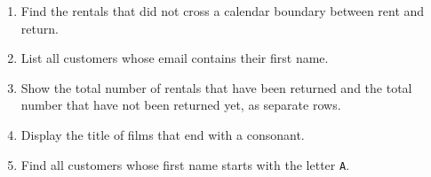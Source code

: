 \documentclass[12pt,a4paper]{article}
\newif\ifshowsolutions
\begin{document}
\begin{enumerate}

    \item Find the rentals that did not cross a calendar boundary between rent and return.

    \ifshowsolutions
    \begin{lstlisting}[language=SQL]
    SELECT rental_id, rental_date, return_date
    FROM rental
    WHERE EXTRACT(MONTH FROM rental_date) =
          EXTRACT(MONTH FROM return_date);
    \end{lstlisting}
    \fi

\item List all customers whose email contains their first name.

\ifshowsolutions
\textbf{Solution:}
\begin{lstlisting}[language=SQL]
SELECT first_name, last_name, email
FROM customer
WHERE POSITION(LOWER(first_name) IN LOWER(email)) > 0;
\end{lstlisting}
\fi

    \item Show the total number of rentals that have been returned and the total number that have not been returned yet, as separate rows.

    \ifshowsolutions
    \begin{lstlisting}[language=SQL]
    SELECT 'Returned' AS status, COUNT(*) AS total
    FROM rental
    WHERE return_date IS NOT NULL

    UNION ALL
    
    SELECT 'Not Returned' AS status, COUNT(*) AS total
    FROM rental
    WHERE return_date IS NULL;
    \end{lstlisting}
    \fi

    \item Display the title of films that end with a consonant.

    \ifshowsolutions
    \begin{lstlisting}[language=SQL]
    SELECT title
    FROM film
    WHERE LOWER(title) NOT LIKE '%a'
      AND LOWER(title) NOT LIKE '%e'
      AND LOWER(title) NOT LIKE '%i'
      AND LOWER(title) NOT LIKE '%o'
      AND LOWER(title) NOT LIKE '%u';
    \end{lstlisting}
    \fi

    \item Find all customers whose first name starts with the letter \texttt{A}.

    \ifshowsolutions
    \begin{lstlisting}[language=SQL]
    SELECT first_name, last_name
    FROM customer
    WHERE first_name LIKE 'A%';
    \end{lstlisting}
    \fi


\end{enumerate}
\end{document}
